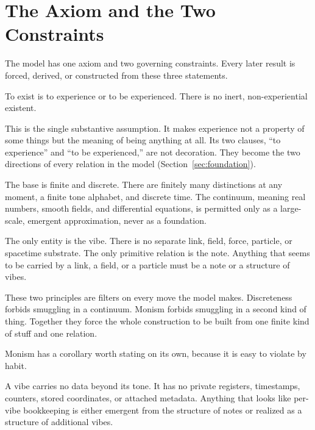 \section{The Axiom and the Two Constraints}
\label{sec:constraints}

The model has one axiom and two governing constraints. Every later result is forced, derived, or constructed from these three statements.

\begin{axiom}[Experience]
To exist is to experience or to be experienced. There is no inert, non-experiential existent.
\end{axiom}

This is the single substantive assumption. It makes experience not a property of some things but the meaning of being anything at all. Its two clauses, ``to experience'' and ``to be experienced,'' are not decoration. They become the two directions of every relation in the model (Section~\ref{sec:foundation}).

\begin{principle}[Discreteness]
The base is finite and discrete. There are finitely many distinctions at any moment, a finite tone alphabet, and discrete time. The continuum, meaning real numbers, smooth fields, and differential equations, is permitted only as a large-scale, emergent approximation, never as a foundation.
\end{principle}

\begin{principle}[Monism]
The only entity is the vibe. There is no separate link, field, force, particle, or spacetime substrate. The only primitive relation is the note. Anything that seems to be carried by a link, a field, or a particle must be a note or a structure of vibes.
\end{principle}

These two principles are filters on every move the model makes. Discreteness forbids smuggling in a continuum. Monism forbids smuggling in a second kind of thing. Together they force the whole construction to be built from one finite kind of stuff and one relation.

Monism has a corollary worth stating on its own, because it is easy to violate by habit.

\begin{principle}
A vibe carries no data beyond its tone. It has no private registers, timestamps, counters, stored coordinates, or attached metadata. Anything that looks like per-vibe bookkeeping is either emergent from the structure of notes or realized as a structure of additional vibes.
\end{principle}

